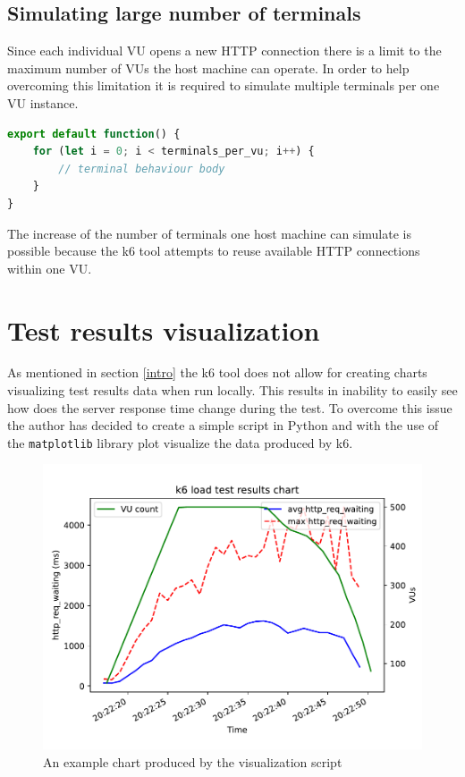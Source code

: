\documentclass[12pt, a4paper]{article}
\let\oldsection\section
\renewcommand\section{\clearpage\oldsection}
\begin{document}
\subsection{Simulating large number of terminals}

Since each individual VU opens a new HTTP connection there is a limit to the maximum number of VUs the host machine can operate.
In order to help overcoming this limitation it is required to simulate multiple terminals per one VU instance.

\begin{lstlisting}[language=JavaScript, caption={Multiple terminals per one VU},captionpos=b]
export default function() {
    for (let i = 0; i < terminals_per_vu; i++) {
        // terminal behaviour body
    }
}
\end{lstlisting}

The increase of the number of terminals one host machine can simulate is possible because the k6 tool attempts to reuse available HTTP connections within one VU.

\section{Test results visualization}

As mentioned in section \ref{intro} the k6 tool does not allow for creating charts visualizing test results data when run locally.
This results in inability to easily see how does the server response time change during the test.
To overcome this issue the author has decided to create a simple script in Python and with the use of the \texttt{matplotlib} library plot visualize the data produced by k6.

\begin{figure}[!ht]
    \centering 
    \includegraphics[width=1\textwidth]{pdf/visualizer-example.pdf}
    \caption{An example chart produced by the visualization script}
\end{figure}
\end{document}
